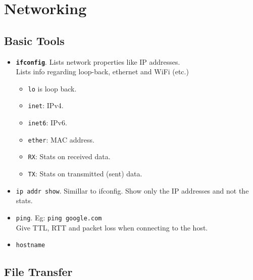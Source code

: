 \section{Networking}

\subsection{Basic Tools}

\begin{itemize}
\item \textbf{\texttt{ifconfig}}. Lists network properties like IP addresses.\\
        Lists info regarding loop-back, ethernet and WiFi (etc.)\\
        \begin{itemize}
        \item \texttt{lo} is loop back.\\
        \item \texttt{inet}: IPv4.\\
        \item \texttt{inet6}: IPv6.\\
        \item \texttt{ether}: MAC address.\\
        \item \texttt{RX}: Stats on received data.\\
        \item \texttt{TX}: Stats on transmitted (sent) data.\\
        \end{itemize}
\item \texttt{ip addr show}. Simillar to ifconfig. Show only the IP addresses and not the stats.
\item \texttt{ping}. Eg: \texttt{ping google.com}\\
        Give TTL, RTT and packet loss when connecting to the host.\\
\item \texttt{hostname}
\end{itemize}


\vfill\null
\columnbreak


\subsection{File Transfer}

